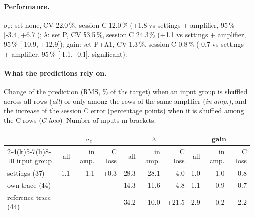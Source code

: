 \paragraph{Performance.}
$\sigma_e$: set none, CV 22.0\,\%, session C 12.0\,\% (+1.8 vs settings + amplifier, 95\,\% [-3.4, +6.7]); $\lambda$: set P, CV 53.5\,\%, session C 24.3\,\% (+1.1 vs settings + amplifier, 95\,\% [-10.9, +12.9]); gain: set P+A1, CV 1.3\,\%, session C 0.8\,\% (-0.7 vs settings + amplifier, 95\,\% [-1.1, -0.1], significant).
\paragraph{What the predictions rely on.} Change of the prediction (RMS, \% of the target) when an input group is shuffled across all rows (\emph{all}) or only among the rows of the same amplifier (\emph{in amp.}), and the increase of the session C error (percentage points) when it is shuffled among the C rows (\emph{C loss}). Number of inputs in brackets.
\begin{center}\footnotesize
\begin{tabular}{lrrrrrrrrr}
\toprule
 & \multicolumn{3}{c}{$\sigma_e$} & \multicolumn{3}{c}{$\lambda$} & \multicolumn{3}{c}{gain} \\
\cmidrule(lr){2-4}\cmidrule(lr){5-7}\cmidrule(lr){8-10}
input group & all & in amp. & C loss & all & in amp. & C loss & all & in amp. & C loss \\
\midrule
settings (37) & 1.1 & 1.1 & +0.3 & 28.3 & 28.1 & +4.0 & 1.0 & 1.0 & +0.8 \\
own trace (44) & -- & -- & -- & 14.3 & 11.6 & +4.8 & 1.1 & 0.9 & +0.7 \\
reference trace (44) & -- & -- & -- & 34.2 & 10.0 & +21.5 & 2.9 & 0.2 & +2.2 \\
\bottomrule
\end{tabular}
\end{center}
